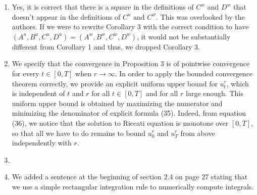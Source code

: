 \documentclass[]{article}
\begin{document}
\begin{enumerate}
	\item Yes, it is correct that there is a square in the definitions of $C^w$ and $D^w$ that doesn't appear in the definitions of $C^u$ and $C^w$. This was overlooked by the authors. If we were to rewrite Corollary 3 with the correct condition to have $(A^u,B^u,C^u,D^u)=(A^w,B^w,C^w,D^w)$, it would not be substantially different from Corollary 1 and thus, we dropped Corollary 3.
	\item We specify that the convergence in Proposition 3 is of pointwise convergence for every $t \in [0,T]$ when $r \to \infty$. In order to apply the bounded convergence theorem correctly, we provide an explicit uniform upper bound for $u_t^{r}$, which is independent of $t$ and $r$ for all $t \in [0,T]$ and for all $r$ large enough.
	This uniform upper bound is obtained by maximizing the numerator and minimizing the denominator of explicit formula (35). Indeed, from equation (36), we notice that the solution to Riccati equation is monotone over $[0,T]$, so that all we have to do remains to bound $u_0^r$ and $u_T^r$ from above independently with $r$.
	\item
	\item We added a sentence at the beginning of section 2.4 on page 27 stating that we use a simple rectangular integration rule to numerically compute integrals.
\end{enumerate}
\end{document}
